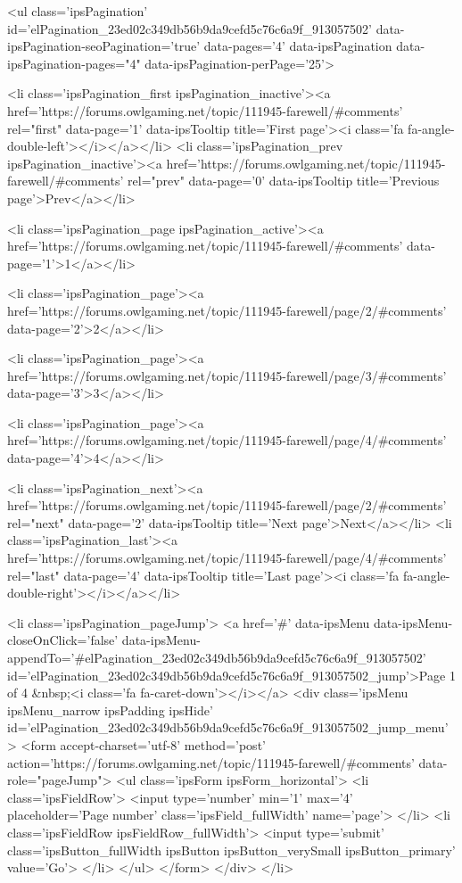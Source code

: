 	
	<ul class='ipsPagination' id='elPagination_23ed02c349db56b9da9cefd5c76c6a9f_913057502' data-ipsPagination-seoPagination='true' data-pages='4' data-ipsPagination  data-ipsPagination-pages="4" data-ipsPagination-perPage='25'>
		
			
				<li class='ipsPagination_first ipsPagination_inactive'><a href='https://forums.owlgaming.net/topic/111945-farewell/#comments' rel="first" data-page='1' data-ipsTooltip title='First page'><i class='fa fa-angle-double-left'></i></a></li>
				<li class='ipsPagination_prev ipsPagination_inactive'><a href='https://forums.owlgaming.net/topic/111945-farewell/#comments' rel="prev" data-page='0' data-ipsTooltip title='Previous page'>Prev</a></li>
			
			<li class='ipsPagination_page ipsPagination_active'><a href='https://forums.owlgaming.net/topic/111945-farewell/#comments' data-page='1'>1</a></li>
			
				
					<li class='ipsPagination_page'><a href='https://forums.owlgaming.net/topic/111945-farewell/page/2/#comments' data-page='2'>2</a></li>
				
					<li class='ipsPagination_page'><a href='https://forums.owlgaming.net/topic/111945-farewell/page/3/#comments' data-page='3'>3</a></li>
				
					<li class='ipsPagination_page'><a href='https://forums.owlgaming.net/topic/111945-farewell/page/4/#comments' data-page='4'>4</a></li>
				
				<li class='ipsPagination_next'><a href='https://forums.owlgaming.net/topic/111945-farewell/page/2/#comments' rel="next" data-page='2' data-ipsTooltip title='Next page'>Next</a></li>
				<li class='ipsPagination_last'><a href='https://forums.owlgaming.net/topic/111945-farewell/page/4/#comments' rel="last" data-page='4' data-ipsTooltip title='Last page'><i class='fa fa-angle-double-right'></i></a></li>
			
			
				<li class='ipsPagination_pageJump'>
					<a href='#' data-ipsMenu data-ipsMenu-closeOnClick='false' data-ipsMenu-appendTo='#elPagination_23ed02c349db56b9da9cefd5c76c6a9f_913057502' id='elPagination_23ed02c349db56b9da9cefd5c76c6a9f_913057502_jump'>Page 1 of 4 &nbsp;<i class='fa fa-caret-down'></i></a>
					<div class='ipsMenu ipsMenu_narrow ipsPadding ipsHide' id='elPagination_23ed02c349db56b9da9cefd5c76c6a9f_913057502_jump_menu'>
						<form accept-charset='utf-8' method='post' action='https://forums.owlgaming.net/topic/111945-farewell/#comments' data-role="pageJump">
							<ul class='ipsForm ipsForm_horizontal'>
								<li class='ipsFieldRow'>
									<input type='number' min='1' max='4' placeholder='Page number' class='ipsField_fullWidth' name='page'>
								</li>
								<li class='ipsFieldRow ipsFieldRow_fullWidth'>
									<input type='submit' class='ipsButton_fullWidth ipsButton ipsButton_verySmall ipsButton_primary' value='Go'>
								</li>
							</ul>
						</form>
					</div>
				</li>
			
